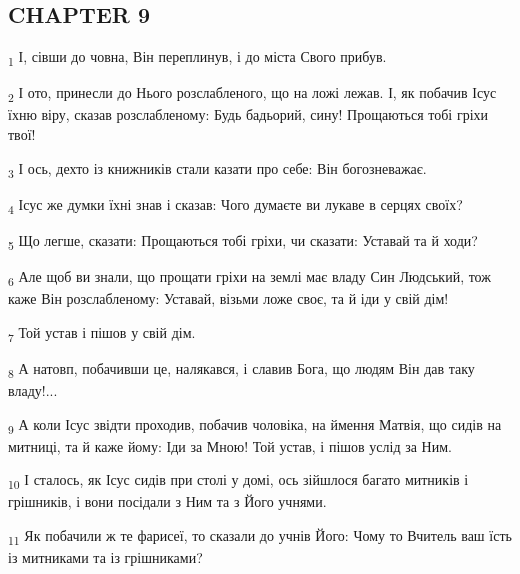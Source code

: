 \subsection{CHAPTER 9}
\begin{tcolorbox}
\textsubscript{1} І, сівши до човна, Він переплинув, і до міста Свого прибув.
\end{tcolorbox}
\begin{tcolorbox}
\textsubscript{2} І ото, принесли до Нього розслабленого, що на ложі лежав. І, як побачив Ісус їхню віру, сказав розслабленому: Будь бадьорий, сину! Прощаються тобі гріхи твої!
\end{tcolorbox}
\begin{tcolorbox}
\textsubscript{3} І ось, дехто із книжників стали казати про себе: Він богозневажає.
\end{tcolorbox}
\begin{tcolorbox}
\textsubscript{4} Ісус же думки їхні знав і сказав: Чого думаєте ви лукаве в серцях своїх?
\end{tcolorbox}
\begin{tcolorbox}
\textsubscript{5} Що легше, сказати: Прощаються тобі гріхи, чи сказати: Уставай та й ходи?
\end{tcolorbox}
\begin{tcolorbox}
\textsubscript{6} Але щоб ви знали, що прощати гріхи на землі має владу Син Людський, тож каже Він розслабленому: Уставай, візьми ложе своє, та й іди у свій дім!
\end{tcolorbox}
\begin{tcolorbox}
\textsubscript{7} Той устав і пішов у свій дім.
\end{tcolorbox}
\begin{tcolorbox}
\textsubscript{8} А натовп, побачивши це, налякався, і славив Бога, що людям Він дав таку владу!...
\end{tcolorbox}
\begin{tcolorbox}
\textsubscript{9} А коли Ісус звідти проходив, побачив чоловіка, на ймення Матвія, що сидів на митниці, та й каже йому: Іди за Мною! Той устав, і пішов услід за Ним.
\end{tcolorbox}
\begin{tcolorbox}
\textsubscript{10} І сталось, як Ісус сидів при столі у домі, ось зійшлося багато митників і грішників, і вони посідали з Ним та з Його учнями.
\end{tcolorbox}
\begin{tcolorbox}
\textsubscript{11} Як побачили ж те фарисеї, то сказали до учнів Його: Чому то Вчитель ваш їсть із митниками та із грішниками?
\end{tcolorbox}
